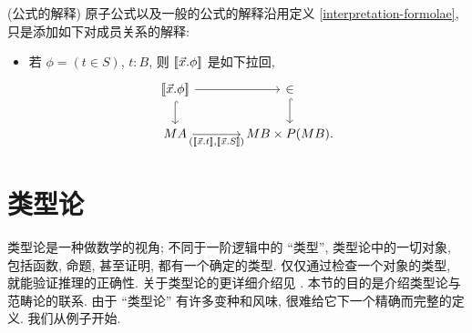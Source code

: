 \begin{definition}
	{(公式的解释)}
	原子公式以及一般的公式的解释沿用定义 \ref{interpretation-formolae}, 只是添加如下对成员关系的解释:
	\begin{itemize}
		\item 若 $\phi = (t\in S)$, $t\colon B$, 则 ${[\![\vec x.\phi]\!]}$ 是如下拉回,
		\[\begin{tikzcd}[ampersand replacement=\&,column sep=large]
			{\interpretation{\vec x.\phi}} \& \in \\
			MA \& {MB\times P(MB).}
			\arrow[hook, from=1-2, to=2-2]
			\arrow["{(\interpretation{\vec x.t},\interpretation{\vec x.S})}"', from=2-1, to=2-2]
			\arrow[hook, from=1-1, to=2-1]
			\arrow[from=1-1, to=1-2]
		\end{tikzcd}\]
	\end{itemize}
\end{definition}

\section{类型论}

\label{appendix-type-theory}



类型论是一种做数学的视角; 不同于一阶逻辑中的 ``类型'', 类型论中的一切对象, 包括函数, 命题, 甚至证明, 都有一个确定的类型. 仅仅通过检查一个对象的类型, 就能验证推理的正确性. 关于类型论的更详细介绍见 \cite{Trebor-History}. 本节的目的是介绍类型论与范畴论的联系.
由于 ``类型论'' 有许多变种和风味, 很难给它下一个精确而完整的定义. 我们从例子开始.

